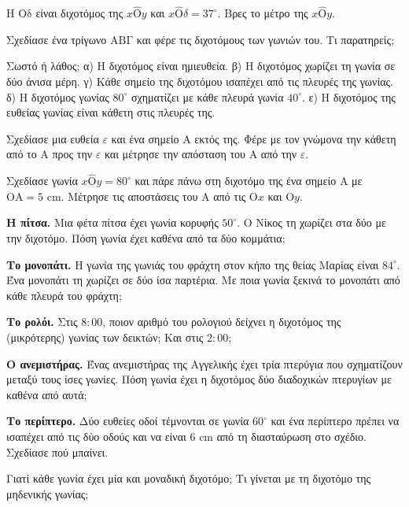 \ex Η $\mathrm{Οδ}$ είναι διχοτόμος της $x\hat{\mathrm{Ο}}y$ και $x\hat{\mathrm{Ο}}\delta=37^\circ$. Βρες το μέτρο της $x\hat{\mathrm{Ο}}y$.

\ex Σχεδίασε ένα τρίγωνο $\mathrm{ΑΒΓ}$ και φέρε τις διχοτόμους των γωνιών του. Τι παρατηρείς;

\ex Σωστό ή λάθος; α) Η διχοτόμος είναι ημιευθεία. \quad β) Η διχοτόμος χωρίζει τη γωνία σε δύο άνισα μέρη. \quad γ) Κάθε σημείο της διχοτόμου ισαπέχει από τις πλευρές της γωνίας. \quad δ) Η διχοτόμος γωνίας $80^\circ$ σχηματίζει με κάθε πλευρά γωνία $40^\circ$. \quad ε) Η διχοτόμος της ευθείας γωνίας είναι κάθετη στις πλευρές της.

\ex Σχεδίασε μια ευθεία $\varepsilon$ και ένα σημείο $\mathrm{Α}$ εκτός της. Φέρε με τον γνώμονα την κάθετη από το $\mathrm{Α}$ προς την $\varepsilon$ και μέτρησε την απόσταση του $\mathrm{Α}$ από την $\varepsilon$.

\ex Σχεδίασε γωνία $x\hat{\mathrm{Ο}}y=80^\circ$ και πάρε πάνω στη διχοτόμο της ένα σημείο $\mathrm{Α}$ με $\mathrm{ΟΑ}=5$ cm. Μέτρησε τις αποστάσεις του $\mathrm{Α}$ από τις $\mathrm{Ο}x$ και $\mathrm{Ο}y$.


\ex \textbf{Η πίτσα.} Μια φέτα πίτσα έχει γωνία κορυφής $50^\circ$. Ο Νίκος τη χωρίζει στα δύο με την διχοτόμο. Πόση γωνία έχει καθένα από τα δύο κομμάτια;

\ex \textbf{Το μονοπάτι.} Η γωνία της γωνιάς του φράχτη στον κήπο της θείας Μαρίας είναι $84^\circ$. Ένα μονοπάτι τη χωρίζει σε δύο ίσα παρτέρια. Με ποια γωνία ξεκινά το μονοπάτι από κάθε πλευρά του φράχτη;

\ex \textbf{Το ρολόι.} Στις $8{:}00$, ποιον αριθμό του ρολογιού δείχνει η διχοτόμος της (μικρότερης) γωνίας των δεικτών; Και στις $2{:}00$;

\ex \textbf{Ο ανεμιστήρας.} Ένας ανεμιστήρας της Αγγελικής έχει τρία πτερύγια που σχηματίζουν μεταξύ τους ίσες γωνίες. Πόση γωνία έχει η διχοτόμος δύο διαδοχικών πτερυγίων με καθένα από αυτά;

\ex \textbf{Το περίπτερο.} Δύο ευθείες οδοί τέμνονται σε γωνία $60^\circ$ και ένα περίπτερο πρέπει να ισαπέχει από τις δύο οδούς και να είναι $6$ cm από τη διασταύρωση στο σχέδιο. Σχεδίασε πού μπαίνει.


\ex Γιατί κάθε γωνία έχει μία και μοναδική διχοτόμο; Τι γίνεται με τη διχοτόμο της μηδενικής γωνίας;

